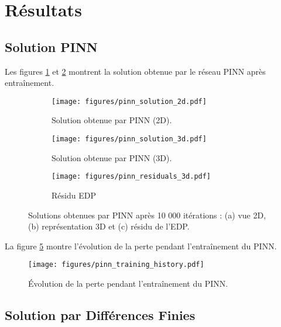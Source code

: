 \documentclass[11pt,a4paper]{article}
\begin{document}
\section{Résultats}

\subsection{Solution PINN}

Les figures \ref{fig:pinn_solution_2d} et \ref{fig:pinn_solution_3d} montrent la solution obtenue par le réseau PINN après entraînement.

\begin{figure}[H]
    \centering
    \begin{subfigure}{0.45\textwidth}
        \centering
        \texttt{[image: figures/pinn\_solution\_2d.pdf]}
        \caption{Solution obtenue par PINN (2D).}
        \label{fig:pinn_solution_2d}
    \end{subfigure}
    \hfill
    \begin{subfigure}{0.45\textwidth}
        \centering
        \texttt{[image: figures/pinn\_solution\_3d.pdf]}
        \caption{Solution obtenue par PINN (3D).}
        \label{fig:pinn_solution_3d}
    \end{subfigure}
    \begin{subfigure}{0.45\textwidth}
        \centering
        \texttt{[image: figures/pinn\_residuals\_3d.pdf]}
        \caption{Résidu EDP}
        \label{fig:pinn_resid_3d} 
    \end{subfigure}
    \caption{Solutions obtenues par PINN après 10 000 itérations : (a) vue 2D, (b) représentation 3D et (c) résidu de l'EDP.}
    \label{fig:pinn_solutions}
\end{figure}

La figure \ref{fig:pinn_training} montre l'évolution de la perte pendant l'entraînement du PINN.

\begin{figure}[H]
    \centering
    \texttt{[image: figures/pinn\_training\_history.pdf]}
    \caption{Évolution de la perte pendant l'entraînement du PINN.}
    \label{fig:pinn_training}
\end{figure}

\subsection{Solution par Différences Finies}
\end{document}

